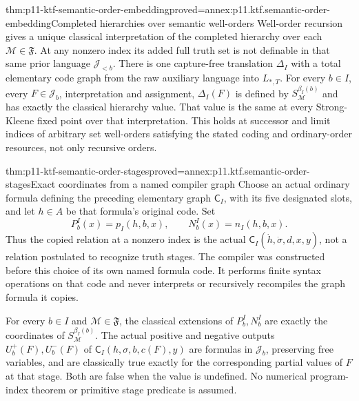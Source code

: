 \begin{hbtheorem}{thm:p11-ktf-semantic-order-embedding}{proved=annex:p11.ktf.semantic-order-embedding}{Completed hierarchies over semantic well-orders}
Well-order recursion gives a unique classical interpretation of the
completed hierarchy over each \(\mathcal M\in\mathfrak F\).
At any nonzero index its added full truth set is not definable in
that same prior language \(\mathcal J_{<b}\).
There is one capture-free translation \(\Delta_I\) with a total
elementary code graph from the raw auxiliary language into
\(L_{*,T}\). For every \(b\in I\), every
\(F\in\mathcal J_b\), interpretation and assignment,
\(\Delta_I(F)\) is defined by
\(S_{\mathcal M}^{\beta_I(b)}\) and has exactly the classical
hierarchy value. That value is the same at every Strong-Kleene fixed
point over that interpretation. This holds at successor and limit
indices of arbitrary set well-orders satisfying the stated coding and
ordinary-order resources, not only recursive orders.
\end{hbtheorem}

\begin{hbtheorem}{thm:p11-ktf-semantic-order-stages}{proved=annex:p11.ktf.semantic-order-stages}{Exact coordinates from a named compiler graph}
Choose an actual ordinary formula defining the preceding elementary
graph \(\mathsf C_I\), with its five designated slots, and let
\(h\in A\) be that formula's original code. Set
\[
 P^I_b(x)=p_I(h,b,x),\qquad N^I_b(x)=n_I(h,b,x).
\]
Thus the copied relation at a nonzero index is the actual
\(\mathsf C_I(\dot h,\dot\sigma,d,x,y)\), not a relation
postulated to recognize truth stages. The compiler was constructed
before this choice of its own named formula code. It performs finite
syntax operations on that code and never interprets or recursively
recompiles the graph formula it copies.

For every \(b\in I\) and \(\mathcal M\in\mathfrak F\),
the classical extensions of \(P^I_b,N^I_b\) are exactly the
coordinates of \(S_{\mathcal M}^{\beta_I(b)}\). The actual
positive and negative outputs \(U_b^+(F),U_b^-(F)\) of
\(\mathsf C_I(h,\sigma,b,c(F),y)\) are formulas in
\(\mathcal J_b\), preserving free variables, and are classically
true exactly for the corresponding partial values of \(F\) at
that stage. Both are false when the value is undefined. No numerical
program-index theorem or primitive stage predicate is assumed.
\end{hbtheorem}

